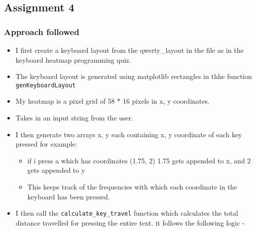 \subsection{Assignment 4}\label{assignment-4}

\subsubsection{Approach followed}\label{approach-followed}

\begin{itemize}
\item
  I first create a keyboard layout from the qwerty\_layout in the file
  as in the keyboard heatmap programming quiz.
\item
  The keyboard layout is generated using matplotlib rectangles in thhe
  function \texttt{genKeyboardLayout}
\item
  My heatmap is a pixel grid of 58 * 16 pixels in x, y coordinates.
\item
  Takes in an input string from the user.
\item
  I then generate two arrays x, y each containing x, y coordinate of
  each key pressed for example:

  \begin{itemize}
  \tightlist
  \item
    if i press a which has coordinates (1.75, 2) 1.75 gets appended to
    x, and 2 gets appended to y
  \item
    This keeps track of the frequencies with which each coordinate in
    the keyboard has been pressed.
  \end{itemize}
\item
  I then call the \texttt{calculate\_key\_travel} function which
  calculates the total distance travelled for pressing the entire text.
  it follows the following logic -


\end{itemize}
